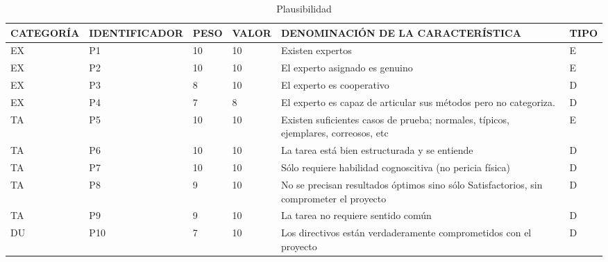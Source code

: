 \documentclass[a4paper,12pt]{article}
\begin{document}
\begin{table}[h]
	\centering
	\begin{tabular}{|l|l|l|l|p{4cm}|l|}
		\hline
		\scriptsize CATEGORÍA & \scriptsize IDENTIFICADOR & \scriptsize PESO & \scriptsize VALOR & \scriptsize DENOMINACIÓN DE LA CARACTERÍSTICA                                           & \scriptsize TIPO \\ \hline
		EX                    & P1                        & 10               & 10                & Existen expertos                                                                        & E                \\ \hline
		EX                    & P2                        & 10               & 10                & El experto asignado es genuino                                                          & E                \\ \hline
		EX                    & P3                        & 8                & 10                & El experto es cooperativo                                                               & D                \\ \hline
		EX                    & P4                        & 7                & 8                 & El experto es capaz de articular sus métodos pero no categoriza.                        & D                \\ \hline
		TA                    & P5                        & 10               & 10                & Existen suficientes casos de prueba; normales, típicos, ejemplares, correosos, etc      & E                \\ \hline
		TA                    & P6                        & 10               & 10                & La tarea está bien estructurada y se entiende                                           & D                \\ \hline
		TA                    & P7                        & 10               & 10                & Sólo requiere habilidad cognoscitiva (no pericia física)                                & D                \\ \hline
		TA                    & P8                        & 9                & 10                & No se precisan resultados óptimos sino sólo Satisfactorios, sin comprometer el proyecto & D                \\ \hline
		TA                    & P9                        & 9                & 10                & La tarea no requiere sentido común                                                      & D                \\ \hline
		DU                    & P10                       & 7                & 10                & Los directivos están verdaderamente comprometidos con el proyecto                       & D                \\ \hline
	\end{tabular}
	\caption{Plausibilidad}
	\label{tab:plausibilidad}
\end{table}
\end{document}
